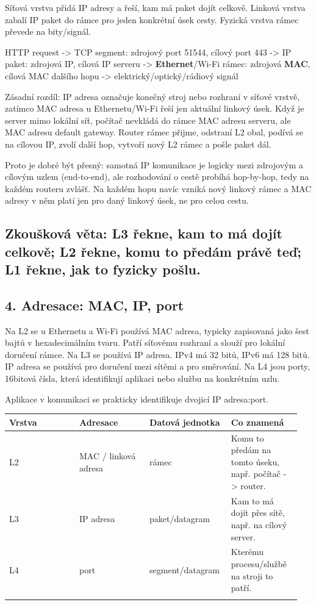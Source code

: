 \documentclass[11pt,a4paper]{article}
\begin{document}
Síťová vrstva přidá IP adresy a řeší, kam má paket dojít celkově. Linková vrstva zabalí IP paket do rámce pro jeden konkrétní úsek cesty. Fyzická vrstva rámec převede na bity/signál.

HTTP request -> TCP segment: zdrojový port 51544, cílový port 443 -> IP paket: zdrojová IP, cílová IP serveru -> \textbf{Ethernet}/Wi-Fi rámec: zdrojová \textbf{MAC}, cílová MAC dalšího hopu -> elektrický/optický/rádiový signál

Zásadní rozdíl: IP adresa označuje konečný stroj nebo rozhraní v síťové vrstvě, zatímco MAC adresa u Ethernetu/Wi-Fi řeší jen aktuální linkový úsek. Když je server mimo lokální síť, počítač nevkládá do rámce MAC adresu serveru, ale MAC adresu default gateway. Router rámec přijme, odstraní L2 obal, podívá se na cílovou IP, zvolí další hop, vytvoří nový L2 rámec a pošle paket dál.

Proto je dobré být přesný: samotná IP komunikace je logicky mezi zdrojovým a cílovým uzlem (end-to-end), ale rozhodování o cestě probíhá hop-by-hop, tedy na každém routeru zvlášť. Na každém hopu navíc vzniká nový linkový rámec a MAC adresy v něm platí jen pro daný linkový úsek, ne pro celou cestu.

\subsection*{Zkoušková věta: L3 řekne, kam to má dojít celkově; L2 řekne, komu to předám právě teď; L1 řekne, jak to fyzicky pošlu.}

\subsection*{4. Adresace: MAC, IP, port}

Na L2 se u Ethernetu a Wi-Fi používá MAC adresa, typicky zapisovaná jako šest bajtů v hexadecimálním tvaru. Patří síťovému rozhraní a slouží pro lokální doručení rámce. Na L3 se používá IP adresa. IPv4 má 32 bitů, IPv6 má 128 bitů. IP adresa se používá pro doručení mezi sítěmi a pro směrování. Na L4 jsou porty, 16bitová čísla, která identifikují aplikaci nebo službu na konkrétním uzlu.

Aplikace v komunikaci se prakticky identifikuje dvojicí IP adresa:port.

\begin{longtable}{p{0.237\linewidth}p{0.237\linewidth}p{0.237\linewidth}p{0.237\linewidth}}
\toprule
\textbf{Vrstva} & \textbf{Adresace} & \textbf{Datová jednotka} & \textbf{Co znamená} \\
\midrule\endhead
L2 & MAC / linková adresa & rámec & Komu to předám na tomto úseku, např. počítač -> router. \\
\addlinespace
L3 & IP adresa & paket/datagram & Kam to má dojít přes sítě, např. na cílový server. \\
\addlinespace
L4 & port & segment/datagram & Kterému procesu/službě na stroji to patří. \\
\addlinespace
\bottomrule
\end{longtable}
\end{document}
